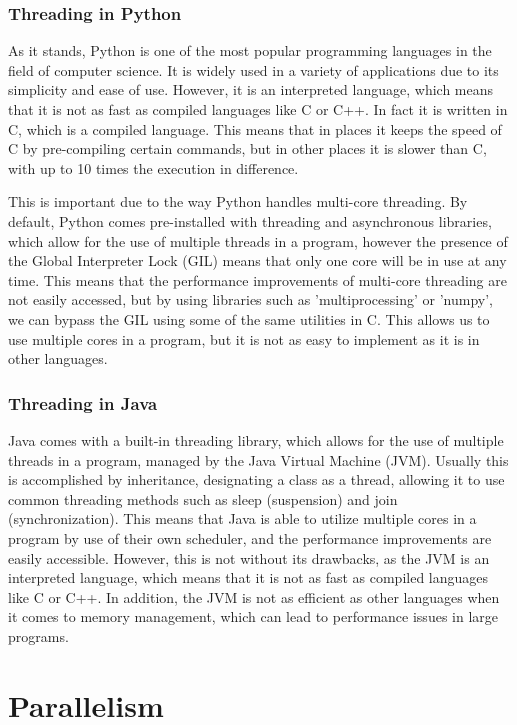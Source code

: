 \documentclass[12pt,a4paper]{article}
\begin{document}
\subsubsection{Threading in Python}

As it stands, Python is one of the most popular programming languages in the field of computer science. It is widely used in a variety of applications due to its simplicity and ease of use. However, it is an interpreted language, which means that it is not as fast as compiled languages like C or C++. In fact it is written in C, which is a compiled language. This means that in places it keeps the speed of C by pre-compiling certain commands, but in other places it is slower than C, with up to 10 times the execution in difference.

This is important due to the way Python handles multi-core threading. By default, Python comes pre-installed with threading and asynchronous libraries, which allow for the use of multiple threads in a program, however the presence of the Global Interpreter Lock (GIL) means that only one core will be in use at any time. This means that the performance improvements of multi-core threading are not easily accessed, but by using libraries such as 'multiprocessing' or 'numpy', we can bypass the GIL using some of the same utilities in C. This allows us to use multiple cores in a program, but it is not as easy to implement as it is in other languages.

\subsubsection{Threading in Java}

Java comes with a built-in threading library, which allows for the use of multiple threads in a program, managed by the Java Virtual Machine (JVM). Usually this is accomplished by inheritance, designating a class as a thread, allowing it to use common threading methods such as sleep (suspension) and join (synchronization). This means that Java is able to utilize multiple cores in a program by use of their own scheduler, and the performance improvements are easily accessible. However, this is not without its drawbacks, as the JVM is an interpreted language, which means that it is not as fast as compiled languages like C or C++. In addition, the JVM is not as efficient as other languages when it comes to memory management, which can lead to performance issues in large programs. 

\section{Parallelism}
\end{document}
